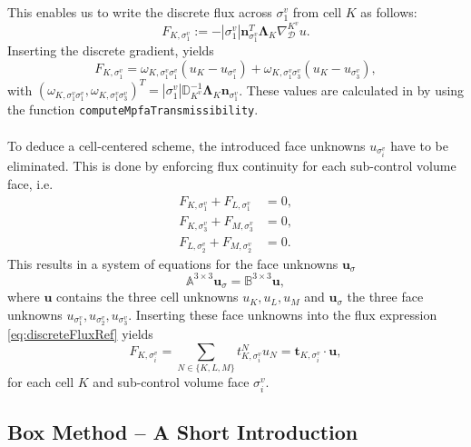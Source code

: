 This enables us to write the discrete flux across $\sigma^v_1$ from cell $K$ as follows:
\begin{equation}
    F_{K, \sigma^v_1} := - |\sigma^v_1| \mathbf{n}_{\sigma^v_1}^T \mathbf{\Lambda}_K \nabla_\mathcal{D}^{K^v} u.
    \label{eq:discreteFlux}
\end{equation}
Inserting the discrete gradient, yields
\begin{equation}
    F_{K, \sigma^v_1} = \omega_{K,\sigma^v_1\sigma^v_1}(u_K - u_{\sigma^v_1}) + \omega_{K,\sigma^v_1 \sigma^v_3}(u_K - u_{\sigma^v_3}),
    \label{eq:discreteFluxRef}
\end{equation}
with $(\omega_{K,\sigma^v_1\sigma^v_1},\omega_{K,\sigma^v_1 \sigma^v_3})^T = |\sigma^v_1| \mathbb{D}^{-1}_{K^v}\mathbf{\Lambda}_K \mathbf{n}_{\sigma^v_1}$. These values are calculated in \Dumux by using the function \texttt{computeMpfaTransmissibility}.
\\ \ \\
To deduce a cell-centered scheme, the introduced face unknowns $u_{\sigma^v_i}$ have to be eliminated. This is done by enforcing flux continuity for each sub-control volume face, i.e.
\begin{align}
F_{K, \sigma^v_1} + F_{L, \sigma^v_1} &= 0, \\ F_{K, \sigma^v_3} + F_{M, \sigma^v_3} &= 0, \\ F_{L, \sigma^v_2} + F_{M, \sigma^v_2} &= 0.
\end{align}
This results in a system of equations for the face unknowns $\mathbf{u}_{\sigma}$
\begin{equation}
\mathbb{A}^{3\times 3} \mathbf{u}_{\sigma} = \mathbb{B}^{3\times 3} \mathbf{u},
\end{equation}
where $\mathbf{u}$ contains the three cell unknowns $u_K,u_L,u_M$ and $\mathbf{u}_{\sigma}$ the three face unknowns $u_{\sigma^v_1}, u_{\sigma^v_2}, u_{\sigma^v_3}$.
Inserting these face unknowns into the flux expression \eqref{eq:discreteFluxRef} yields
\begin{equation}
    F_{K,\sigma^v_i} = \sum_{N \in \lbrace K,L,M \rbrace } t^N_{K,\sigma^v_i} u_{N} = \mathbf{t}_{K,\sigma^v_i} \cdot \mathbf{u},
    \label{eq:FVFluxExpressionSubFace}
\end{equation}
for each cell $K$ and sub-control volume face $\sigma^v_i$.
%
%
\subsection{Box Method -- A Short Introduction}\label{box}

